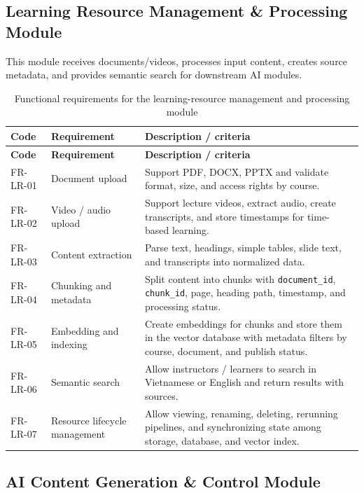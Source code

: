 \subsection{Learning Resource Management \& Processing Module}
\label{subsec:module-quan-ly-xu-ly-hoc-lieu}

This module receives documents/videos, processes input content, creates source
metadata, and provides semantic search for downstream AI modules.

\begin{longtable}{|p{2.4cm}|p{5.1cm}|p{6.9cm}|}
\caption{Functional requirements for the learning-resource management and processing module}
\label{tab:fr-hoc-lieu}\\
\hline
\textbf{Code} & \textbf{Requirement} & \textbf{Description / criteria} \\
\hline
\endfirsthead
\hline
\textbf{Code} & \textbf{Requirement} & \textbf{Description / criteria} \\
\hline
\endhead
FR-LR-01 & Document upload & Support PDF, DOCX, PPTX and validate format, size, and access rights by course. \\
\hline
FR-LR-02 & Video / audio upload & Support lecture videos, extract audio, create transcripts, and store timestamps for time-based learning. \\
\hline
FR-LR-03 & Content extraction & Parse text, headings, simple tables, slide text, and transcripts into normalized data. \\
\hline
FR-LR-04 & Chunking and metadata & Split content into chunks with \texttt{document\_id}, \texttt{chunk\_id}, page, heading path, timestamp, and processing status. \\
\hline
FR-LR-05 & Embedding and indexing & Create embeddings for chunks and store them in the vector database with metadata filters by course, document, and publish status. \\
\hline
FR-LR-06 & Semantic search & Allow instructors / learners to search in Vietnamese or English and return results with sources. \\
\hline
FR-LR-07 & Resource lifecycle management & Allow viewing, renaming, deleting, rerunning pipelines, and synchronizing state among storage, database, and vector index. \\
\hline
\end{longtable}

\subsection{AI Content Generation \& Control Module}
\label{subsec:module-kiem-soat-sinh-noi-dung-ai}


